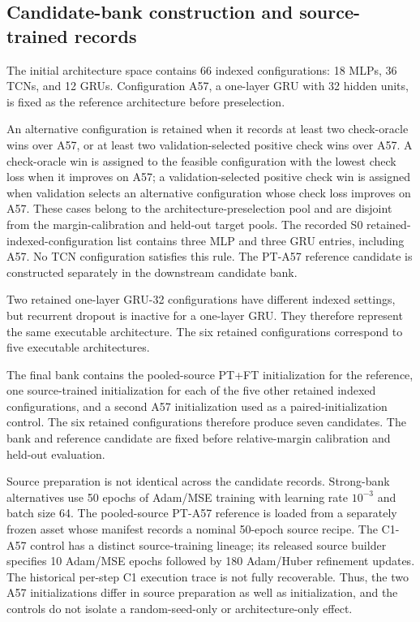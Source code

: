 \documentclass[11pt,a4paper]{article}
\begin{document}
\subsection{Candidate-bank construction and source-trained records}

The initial architecture space contains 66 indexed configurations: 18 MLPs,
36 TCNs, and 12 GRUs. Configuration A57, a one-layer GRU with 32 hidden
units, is fixed as the reference architecture before preselection.

An alternative configuration is retained when it records at least two
check-oracle wins over A57, or at least two validation-selected positive check
wins over A57. A check-oracle win is assigned to the feasible configuration
with the lowest check loss when it improves on A57; a validation-selected
positive check win is assigned when validation selects an alternative
configuration whose check loss improves on A57.
These cases belong to the architecture-preselection pool and are disjoint from
the margin-calibration and held-out target pools.
The recorded S0 retained-indexed-configuration list contains three MLP and
three GRU entries, including A57. No TCN configuration satisfies this rule.
The PT-A57 reference candidate is constructed separately in the downstream
candidate bank.

Two retained one-layer GRU-32 configurations have different indexed
settings, but recurrent dropout is inactive for a one-layer GRU. They
therefore represent the same executable architecture. The six retained
configurations correspond to five executable architectures.

The final bank contains the pooled-source PT+FT initialization for
the reference, one source-trained initialization for each of the five other
retained indexed configurations, and a second A57 initialization used as a
paired-initialization control. The six retained configurations therefore
produce seven candidates. The bank and reference candidate are fixed
before relative-margin calibration and held-out evaluation.

Source preparation is not identical across the candidate records. Strong-bank
alternatives use 50 epochs of Adam/MSE training with learning rate $10^{-3}$
and batch size 64. The pooled-source PT-A57 reference is loaded from a
separately frozen asset whose manifest records a nominal 50-epoch source
recipe. The C1-A57 control has a distinct source-training lineage; its
released source builder specifies 10 Adam/MSE epochs followed by 180
Adam/Huber refinement updates. The historical per-step C1 execution trace is
not fully recoverable. Thus, the two A57 initializations differ in source
preparation as well as initialization, and the controls do not isolate a
random-seed-only or architecture-only effect.
\end{document}
